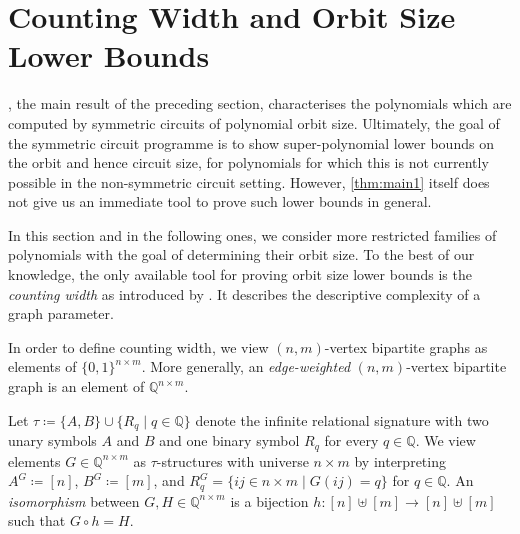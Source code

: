 \documentclass[10pt,a4paper]{article}
\theoremstyle{definition}
\theoremstyle{plain}
\theoremstyle{remark}
\begin{document}
	\section{Counting Width and Orbit Size Lower Bounds}
	
	, the main result of the preceding section, characterises the polynomials which are computed by symmetric circuits of polynomial orbit size. Ultimately, the goal of the symmetric circuit programme is to show super-polynomial lower bounds on the orbit and hence circuit size, for polynomials for which this is not currently possible in the non-symmetric circuit setting. However, \cref{thm:main1} itself does not give us an immediate tool to prove such lower bounds in general. 
	
	In this section and in the following ones, we consider more restricted families of polynomials with the goal of determining their orbit size.
	To the best of our knowledge, the only available tool for proving orbit size lower bounds is the \emph{counting width} as introduced by \textcite{dawar_definability_2017}.
	It describes the descriptive complexity of a graph parameter.
	
	In order to define counting width, we view $(n,m)$-vertex bipartite graphs as elements of $\{0,1\}^{n \times m}$.
	More generally, an \emph{edge-weighted} $(n,m)$-vertex bipartite graph is an element of $\mathbb{Q}^{n \times m}$. 
	
	Let $\tau \coloneqq \{A, B\} \cup \{R_q \mid q \in \mathbb{Q}\}$ denote the infinite relational signature with two unary symbols $A$ and $B$ and one binary symbol $R_q$ for every $q \in \mathbb{Q}$.
	We view elements $G \in \mathbb{Q}^{n \times m}$ as $\tau$-structures with universe $n \times m$ by interpreting $A^G \coloneqq [n]$, $B^G \coloneqq [m]$, and $R_q^G = \{ij \in n \times m \mid G(ij) = q\}$ for $q \in \mathbb{Q}$.
	An \emph{isomorphism} between $G, H \in \mathbb{Q}^{n \times m}$ is a bijection $h \colon [n] \uplus [m] \to [n] \uplus [m]$ such that $G \circ h = H$.
	
\end{document}
